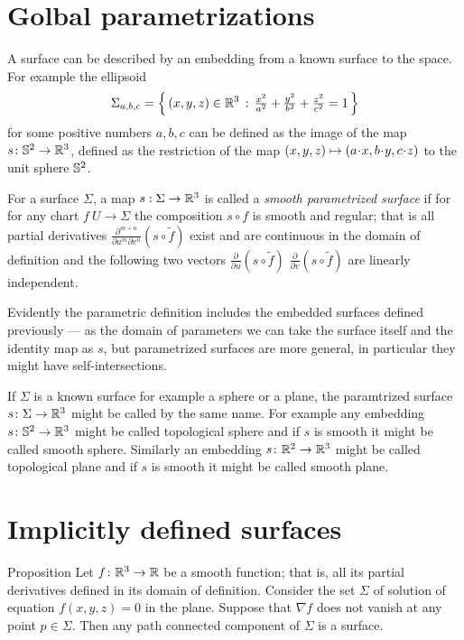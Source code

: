 \section*{Golbal parametrizations} 
A surface can be described by an embedding from a known surface to the space.
For example the ellipsoid
\[\Sigma_{a,b,c}=\left\{\,{(x,y,z)\in\mathbb{R}^3}\,:\,{\tfrac{x^2}{a^2}+\tfrac{y^2}{b^2}+\tfrac{z^2}{c^2}=1}\,\right\}\]
for some positive numbers $a,b,c$ can be defined as the image of the map $s\colon\mathbb{S}^2\to\mathbb{R}^3$, defined as the restriction of the map $(x,y,z)\z\mapsto (a\cdot x, b\cdot y,c\cdot z)$ to the unit sphere $\mathbb{S}^2$.

For a surface $\Sigma$, a map $s: \Sigma \to \mathbb{R} ^3$ is called a 
\emph{smooth parametrized surface} if for for any chart $f\:U\to \Sigma$ 
the composition $s\circ f$ is smooth and regular;
that is all partial derivatives $\frac{\partial^{m+n}}{\partial u^m\partial v^n}(s\circ \tilde{f})$ exist and are continuous in the domain of definition and the following two vectors 
$\frac{\partial}{\partial u}(s\circ \tilde{f})$ $\frac{\partial}{\partial v}(s\circ \tilde{f})$ are linearly independent.

Evidently the parametric definition includes the embedded surfaces defined previously --- as the domain of parameters we can take the surface itself and the identity map as $s$,
but parametrized surfaces are more general, in particular they  might  have self-intersections.

If $\Sigma$ is a known surface for example a sphere or a plane, the paramtrized surface $s\colon\Sigma\to\mathbb{R}^3$ might be called by the same name.
For example any embedding $s\colon\mathbb{S}^2\to\mathbb{R}^3$ might be called topological sphere
and if $s$ is smooth it might be called smooth sphere.
Similarly an embedding $s\colon\mathbb{R}^2\to\mathbb{R}^3$ might be called topological plane
and if $s$ is smooth it might be called smooth plane.

\section*{Implicitly defined surfaces}

\begin{thm}{Proposition}
Let $f\colon\mathbb{R}^3\to \mathbb{R}$ be a smooth function; 
that is, all its partial derivatives defined in its domain of definition.
Consider the set $\Sigma$ of solution of equation $f(x,y,z)=0$ in the plane.
Suppose that $\nabla f$ does not vanish at any point $p\in \Sigma$.
Then any path connected component of $\Sigma$ is a surface.
\end{thm}


